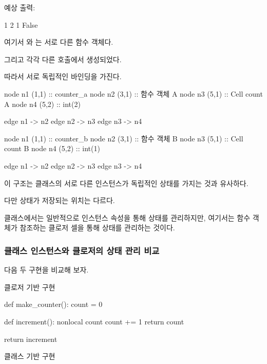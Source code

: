 예상 출력:

\begin{dhkzsh}
1
2
1
False
\end{dhkzsh}

여기서 와 는 서로 다른 함수 객체다.

그리고 각각 다른  호출에서 생성되었다.

따라서 서로 독립적인  바인딩을 가진다.

\begin{dhkdiagram}[in=6]
node n1 (1,1) :: counter_a
node n2 (3,1) :: 함수 객체 A
node n3 (5,1) :: Cell count A
node n4 (5,2) :: int(2)

edge n1 -> n2
edge n2 -> n3
edge n3 -> n4
\end{dhkdiagram}

\begin{dhkdiagram}[in=6]
node n1 (1,1) :: counter_b
node n2 (3,1) :: 함수 객체 B
node n3 (5,1) :: Cell count B
node n4 (5,2) :: int(1)

edge n1 -> n2
edge n2 -> n3
edge n3 -> n4
\end{dhkdiagram}

이 구조는 클래스의 서로 다른 인스턴스가 독립적인 상태를 가지는 것과 유사하다.

다만 상태가 저장되는 위치는 다르다.

클래스에서는 일반적으로 인스턴스 속성을 통해 상태를 관리하지만, 여기서는 함수 객체가 참조하는 클로저 셀을 통해 상태를 관리하는 것이다.

\subsubsection{클래스 인스턴스와 클로저의 상태 관리 비교}

다음 두 구현을 비교해 보자.

\begin{dhknote}
\begin{dhksmry}[centered]
클로저 기반 구현
\end{dhksmry}
\end{dhknote}

\begin{dhkcode}
def make_counter():
    count = 0

    def increment():
        nonlocal count
        count += 1
        return count

    return increment
\end{dhkcode}

\begin{dhknote}
\begin{dhksmry}[centered]
클래스 기반 구현
\end{dhksmry}
\end{dhknote}

